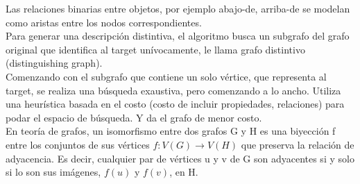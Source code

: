 Las relaciones binarias entre objetos, por ejemplo abajo-de, arriba-de se modelan como aristas entre los nodos correspondientes.\\



Para generar una descripci\'on distintiva, el algoritmo busca un subgrafo del grafo original que identifica al target un\'{i}vocamente, le llama grafo distintivo (distinguishing graph).\\

Comenzando con el subgrafo que contiene un solo v\'ertice, que representa al target, se realiza una b\'usqueda exaustiva, pero comenzando a lo ancho. Utiliza una heur\'{i}stica basada en el costo (costo de incluir propiedades, relaciones) para podar el espacio de b\'usqueda. Y da el grafo de menor costo. \\



En teor\'{i}a de grafos, un isomorfismo entre dos grafos G y H es una biyecci\'on f entre los conjuntos de sus v\'ertices $f:V(G) \rightarrow V(H)$ que preserva la relaci\'on de adyacencia. Es decir, cualquier par de v\'ertices u y v de G son adyacentes si y solo si lo son sus im\'agenes, $f(u)$ y $f(v)$, en H.\\


